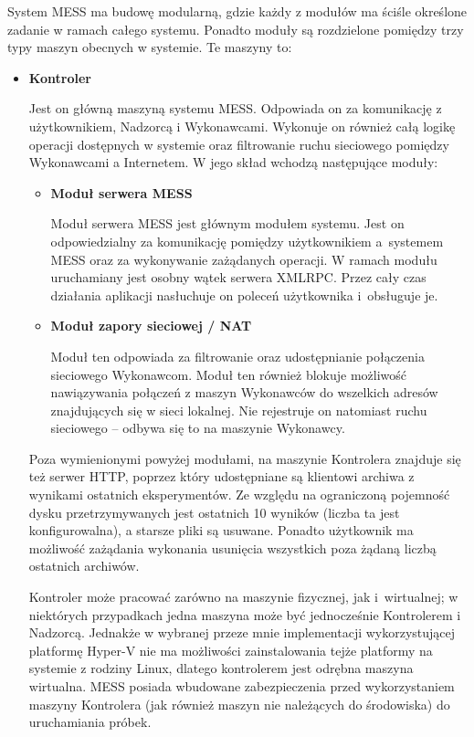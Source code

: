 \documentclass[a4paper,12pt,oneside]{article}
\begin{document}
	System MESS ma budowę modularną, gdzie każdy z modułów ma ściśle określone zadanie w ramach całego systemu. Ponadto moduły są rozdzielone pomiędzy trzy typy maszyn obecnych w systemie. Te maszyny to:
	\begin{itemize}
		\item \textbf{Kontroler}
		
		Jest on główną maszyną systemu MESS. Odpowiada on za komunikację z użytkownikiem, Nadzorcą i Wykonawcami. Wykonuje on również całą logikę operacji dostępnych w systemie oraz filtrowanie ruchu sieciowego pomiędzy Wykonawcami a Internetem. W jego skład wchodzą następujące moduły:
		
		\begin{itemize}			
			\item \textbf{Moduł serwera MESS}
			
			Moduł serwera MESS jest głównym modułem systemu. Jest on odpowiedzialny za komunikację pomiędzy użytkownikiem a~systemem MESS oraz za wykonywanie zażądanych operacji.
			W ramach modułu uruchamiany jest osobny wątek serwera XMLRPC. Przez cały czas działania aplikacji nasłuchuje on poleceń użytkownika i~obsługuje je.
						
			\item \textbf{Moduł zapory sieciowej / NAT}
			
			Moduł ten odpowiada za filtrowanie oraz udostępnianie połączenia sieciowego Wykonawcom. Moduł ten również blokuje możliwość nawiązywania połączeń z maszyn Wykonawców do wszelkich adresów znajdujących się w sieci lokalnej. Nie rejestruje on natomiast ruchu sieciowego -- odbywa się to na maszynie Wykonawcy.
			
		\end{itemize}
		
		Poza wymienionymi powyżej modułami, na maszynie Kontrolera znajduje się też serwer HTTP, poprzez który udostępniane są klientowi archiwa z wynikami ostatnich eksperymentów. Ze względu na ograniczoną pojemność dysku przetrzymywanych jest ostatnich 10 wyników (liczba ta jest konfigurowalna), a starsze pliki są usuwane. Ponadto użytkownik ma możliwość zażądania wykonania usunięcia wszystkich poza żądaną liczbą ostatnich archiwów.

		Kontroler może pracować zarówno na maszynie fizycznej, jak i~wirtualnej; w niektórych przypadkach jedna maszyna może być jednocześnie Kontrolerem i Nadzorcą. Jednakże w wybranej przeze mnie implementacji wykorzystującej platformę Hyper-V nie ma możliwości zainstalowania tejże platformy na systemie z rodziny Linux, dlatego kontrolerem jest odrębna maszyna wirtualna. MESS posiada wbudowane zabezpieczenia przed wykorzystaniem maszyny Kontrolera (jak również maszyn nie należących do środowiska) do uruchamiania próbek.
		

\end{itemize}
\end{document}
